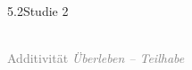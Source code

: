 \documentclass[xcolor=table,9pt,aspectratio=169]{beamer}
\begin{document}
\begin{frame}{\vspace*{10mm}5.2\hspace*{1em}Studie 2}
\begin{center}
   \\
   \textcolor{gray}{Additivität \textit{Überleben -- Teilhabe}}
\end{center}
\end{frame}
\end{document}
